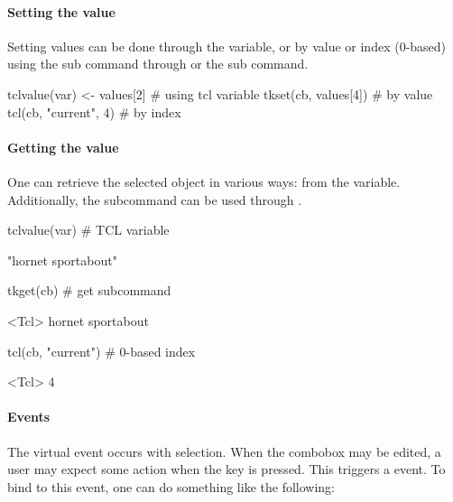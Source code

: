 \paragraph{Setting the value}
Setting values can be done through the \TCL\/ variable, or by value or
index (0-based) using the  sub command
through  or the  sub
command.

\begin{Schunk}
\begin{Sinput}
 tclvalue(var) <- values[2]            # using tcl variable
 tkset(cb, values[4])                  # by value
 tcl(cb, "current", 4)                 # by index
\end{Sinput}
\end{Schunk}


\paragraph{Getting the value}
One can retrieve the selected object in various ways: from the \TCL\/
variable. Additionally, the  subcommand
can be used through .

\begin{Schunk}
\begin{Sinput}
 tclvalue(var)                           # TCL variable
\end{Sinput}
\begin{Soutput}
[1] "hornet sportabout"
\end{Soutput}
\begin{Sinput}
 tkget(cb)                               # get subcommand
\end{Sinput}
\begin{Soutput}
<Tcl> hornet sportabout 
\end{Soutput}
\begin{Sinput}
 tcl(cb, "current")                      # 0-based index
\end{Sinput}
\begin{Soutput}
<Tcl> 4 
\end{Soutput}
\end{Schunk}


\paragraph{Events}
The virtual event  occurs with
selection. When the combobox may be edited, a user may expect some
action when the  key is pressed. This triggers a
 event. To bind to this event, one can do something
like the following:

